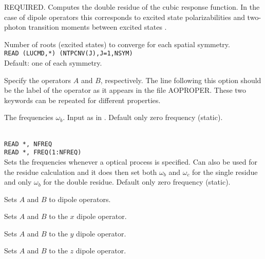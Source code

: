 \begin{description}

\item{}
REQUIRED.
Computes the double residue of the cubic
response function.
In the case of dipole operators this corresponds to excited
state polarizabilities and two-photon transition
moments 
between excited states \cite{djpnylhajcp105}.

\item{}
Number of roots (excited states) to converge for each spatial symmetry. \\
\verb|READ (LUCMD,*) (NTPCNV(J),J=1,NSYM)|\\
Default: one of each symmetry.

\item[\Key{APROP}, \Key{BPROP}]
Specify the operators $A$ and $B$, respectively. The line following this
option should be the label of the operator as it appears in the file
AOPROPER. These two keywords can be repeated for different properties.

\item[\Key{BFREQ}]
The frequencies
$\omega_b$. Input as in .
Default only zero frequency (static).

\item{}\\
\verb|READ *, NFREQ|\\
\verb|READ *, FREQ(1:NFREQ)|\\
Sets the frequencies whenever a optical process is specified.
Can also be used for the residue calculation and it does then set 
both $\omega_b$ and $\omega_c$ for the single residue and only
$\omega_b$ for the double residue.
Default only zero frequency (static).

\item{}
Sets $A$ and  $B$ to dipole operators.

\item{}
Sets $A$ and $B$ to the $x$ dipole operator.

\item{}
Sets $A$ and $B$ to the $y$ dipole operator.

\item{}
Sets $A$ and $B$ to the $z$ dipole operator.


\end{description}
